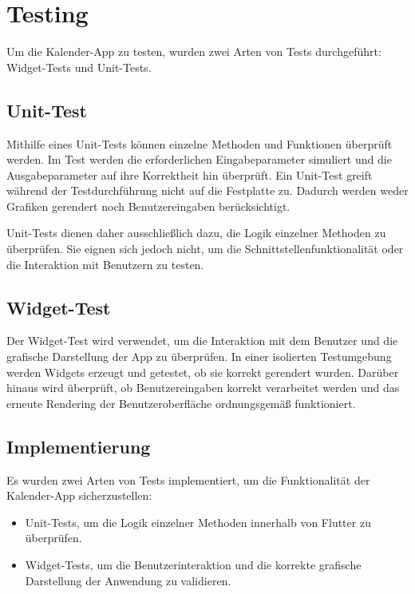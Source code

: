 \chapter{Testing}

Um die Kalender-App zu testen, wurden zwei Arten von Tests durchgeführt: Widget-Tests und Unit-Tests.

\section{Unit-Test}

Mithilfe eines Unit-Tests können einzelne Methoden und Funktionen überprüft werden. Im Test werden die erforderlichen 
Eingabeparameter simuliert und die Ausgabeparameter auf ihre Korrektheit hin überprüft. Ein Unit-Test greift während der 
Testdurchführung nicht auf die Festplatte zu. Dadurch werden weder Grafiken gerendert noch Benutzereingaben berücksichtigt.

Unit-Tests dienen daher ausschließlich dazu, die Logik einzelner Methoden zu überprüfen. Sie eignen sich jedoch nicht, um die
 Schnittstellenfunktionalität oder die Interaktion mit Benutzern zu testen.

\section{Widget-Test}
Der Widget-Test wird verwendet, um die Interaktion mit dem Benutzer und die grafische Darstellung der App zu überprüfen. In einer 
isolierten Testumgebung werden Widgets erzeugt und getestet, ob sie korrekt gerendert wurden. Darüber hinaus wird überprüft, 
ob Benutzereingaben korrekt verarbeitet werden und das erneute Rendering der Benutzeroberfläche ordnungsgemäß funktioniert.

\section{Implementierung}

Es wurden zwei Arten von Tests implementiert, um die Funktionalität der Kalender-App sicherzustellen:
\begin{itemize}
    \item Unit-Tests, um die Logik einzelner Methoden innerhalb von Flutter zu überprüfen.
    \item Widget-Tests, um die Benutzerinteraktion und die korrekte grafische Darstellung der Anwendung zu validieren.
\end{itemize}

